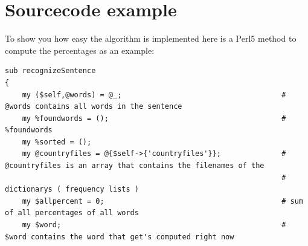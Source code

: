 \section{Sourcecode example}
To show you how easy the algorithm is implemented here is a Perl5 method to compute the percentages as an example:
\small
\small
\begin{verbatim}
sub recognizeSentence
{
    my ($self,@words) = @_;                                     # @words contains all words in the sentence
    my %foundwords = ();                                        # %foundwords 
    my %sorted = ();
    my @countryfiles = @{$self->{'countryfiles'}};              # @countryfiles is an array that contains the filenames of the 
                                                                # dictionarys ( frequency lists )
    my $allpercent = 0;                                         # sum of all percentages of all words 
    my $word;                                                   # $word contains the word that get's computed right now
    

\end{verbatim}
